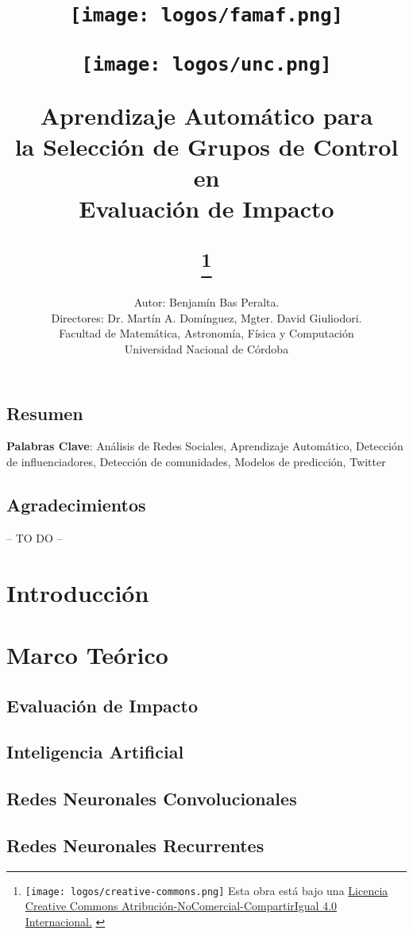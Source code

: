 \documentclass[a4paper,12pt,spanish]{book}
\title{
    \begin{minipage}{0.4\textwidth}
        \centering
        \texttt{[image: logos/famaf.png]}
    \end{minipage}
    \hfill
    \begin{minipage}{0.4\textwidth}
        \centering
        \texttt{[image: logos/unc.png]}
    \end{minipage}
    
    Aprendizaje Automático para \\
    la Selección de Grupos de Control en \\
    Evaluación de Impacto
    
    \thanks{
        {
        {\protect\texttt{[image: logos/creative-commons.png]}} \fontsize{10}{11}\selectfont  Esta obra está bajo una \href{https://creativecommons.org/licenses/by-nc-sa/4.0/}{Licencia Creative Commons Atribución-NoComercial-CompartirIgual 4.0 Internacional.}
        }
    }
}
\author{
    Autor: Benjam\'in Bas Peralta.\\
    Directores: Dr. Martín A. Domínguez, Mgter. David Giuliodori.\\ 
    Facultad de Matemática, Astronomía, Física y Computación\\
    Universidad Nacional de Córdoba
}
\begin{document}
\maketitle
\cleardoublepage

\section*{Resumen}

\bigskip
\textbf{Palabras Clave}: Análisis de Redes Sociales, Aprendizaje Automático, Detección de influenciadores, Detección de comunidades, Modelos de predicción, Twitter
\clearpage

\thispagestyle{empty}
\section*{Agradecimientos}
-- TO DO --
\clearpage

\tableofcontents
\clearpage

\chapter{Introducción}


\chapter{Marco Teórico}

\section{Evaluación de Impacto}


\section{Inteligencia Artificial}


\section{Redes Neuronales Convolucionales}


\section{Redes Neuronales Recurrentes}

\end{document}
